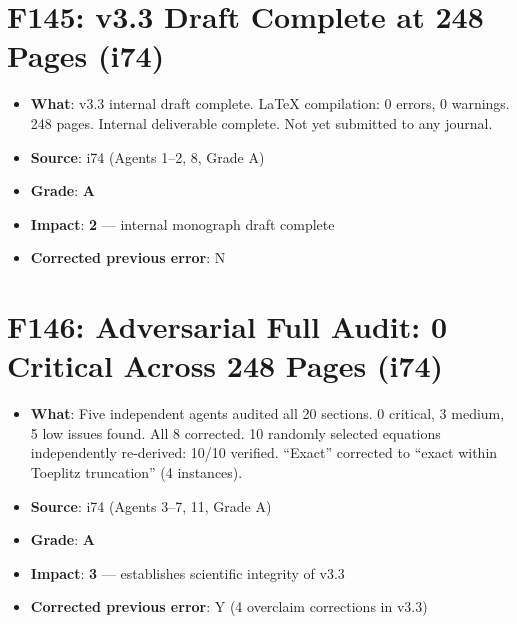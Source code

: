 \documentclass[11pt,a4paper]{article}
\newcommand{\grade}[1]{\textbf{#1}}
\newcommand{\impact}[1]{\textbf{#1}}
\begin{document}
\section{F145: v3.3 Draft Complete at 248 Pages (i74)}
\begin{itemize}[nosep]
\item \textbf{What}: v3.3 internal draft complete. LaTeX compilation: 0 errors, 0 warnings. 248 pages. Internal deliverable complete. Not yet submitted to any journal.
\item \textbf{Source}: i74 (Agents 1--2, 8, Grade A)
\item \textbf{Grade}: \grade{A}
\item \textbf{Impact}: \impact{2} --- internal monograph draft complete
\item \textbf{Corrected previous error}: N
\end{itemize}

\section{F146: Adversarial Full Audit: 0 Critical Across 248 Pages (i74)}
\begin{itemize}[nosep]
\item \textbf{What}: Five independent agents audited all 20 sections. 0 critical, 3 medium, 5 low issues found. All 8 corrected. 10 randomly selected equations independently re-derived: 10/10 verified. ``Exact'' corrected to ``exact within Toeplitz truncation'' (4 instances).
\item \textbf{Source}: i74 (Agents 3--7, 11, Grade A)
\item \textbf{Grade}: \grade{A}
\item \textbf{Impact}: \impact{3} --- establishes scientific integrity of v3.3
\item \textbf{Corrected previous error}: Y (4 overclaim corrections in v3.3)
\end{itemize}

\end{document}
